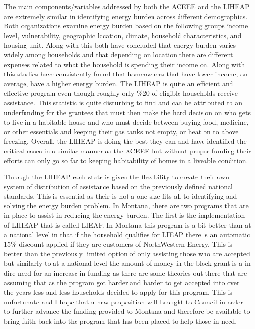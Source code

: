 \documentclass{article}
\begin{document}
The main components/variables addressed by both the ACEEE and the LIHEAP are
extremely similar in identifying energy burden across different demographics.
Both organizations examine energy burden based on the following groups
income level, vulnerability, geographic location, climate, household characteristics,
and housing unit. Along with this both have concluded that energy burden varies
widely among households and that depending on location there are different
expenses related to what the household is spending their income on. Along with
this studies have consistently found that homeowners that have lower income, on
average, have a higher energy burden. The LIHEAP is quite an efficient and effective
program even though roughly only \%20 of eligible households receive assistance.
This statistic is quite disturbing to find and can be attributed to an underfunding
for the grantees that must then make the hard decision on who gets to live in a
habitable house and who must decide between buying food, medicine, or other essentials
and keeping their gas tanks not empty, or heat on to above freezing. Overall,
the LIHEAP is doing the best they can and have identified the critical cases in
a similar manner as the ACEEE but without proper funding their efforts can only
go so far to keeping habitability of homes in a liveable condition.

Through the LIHEAP each state is given the flexibility to create their own system
of distribution of assistance based on the previously defined national standards.
This is essential as their is not a one size fits all to identifying and solving
the energy burden problem. In Montana, there are two programs that are in place
to assist in reducing the energy burden. The first is the implementation of LIHEAP
that is called LIEAP. In Montana this program is a bit better than at a national
level in that if the household qualifies for LIEAP there is an automatic 15\%
discount applied if they are customers of NorthWestern Energy. This is better
than the previously limited option of only assisting those who are accepted but
similarly to at a national level the amount of money in the block grant is a
in dire need for an increase in funding as there are some theories out there
that are assuming that as the program got harder and harder to get accepted into
over the years less and less households decided to apply for this program. This
is unfortunate and I hope that a new proposition will brought to Council in order
to further advance the funding provided to Montana and therefore be available to
bring faith back into the program that has been placed to help those in need.




% 
% 
\end{document}

